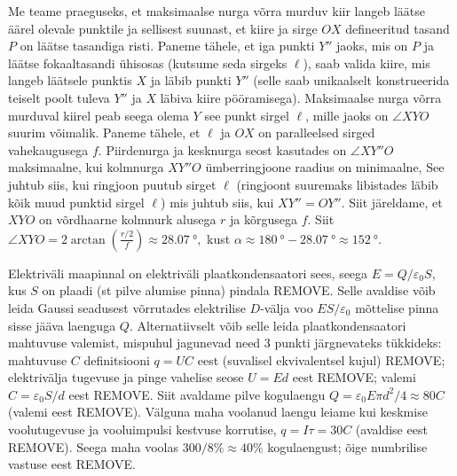 \documentclass[10pt]{article}
\newcommand{\p}[1]{REMOVE}
\begin{document}
Me teame praeguseks, et maksimaalse nurga võrra murduv kiir langeb läätse äärel olevale punktile ja sellisest suunast, et kiire ja sirge $OX$ defineeritud tasand $P$ on läätse tasandiga risti. Paneme tähele, et iga punkti $Y''$ jaoks, mis on $P$ ja läätse fokaaltasandi ühisosas (kutsume seda sirgeks $\ell$), saab valida kiire, mis langeb läätsele punktis $X$ ja läbib punkti $Y''$ (selle saab unikaalselt konstrueerida teiselt poolt tuleva $Y''$ ja $X$ läbiva kiire pööramisega). Maksimaalse nurga võrra murduval kiirel peab seega olema $Y$ see punkt sirgel $\ell$, mille jaoks on $\angle XYO$ suurim võimalik. Paneme tähele, et $\ell$ ja $OX$ on paralleelsed sirged vahekaugusega $f$. Piirdenurga ja kesknurga seost kasutades on $\angle XY''O$ maksimaalne, kui kolmnurga $XY''O$ ümberringjoone raadius on minimaalne, See juhtub siis, kui ringjoon puutub sirget $\ell$ (ringjoont suuremaks libistades läbib kõik muud punktid sirgel $\ell$) mis juhtub siis, kui $XY''=OY''$. Siit järeldame, et $XYO$ on võrdhaarne kolmnurk alusega $r$ ja kõrgusega $f$. Siit $\angle XYO=2\arctan\left(\frac{r/2}{f}\right)\approx \SI{28.07}{\degree},$ kust $\alpha\approx \SI{180}{\degree}-\SI{28.07}{\degree} \approx \SI{152}{\degree}$.
\probend
\bigskip


\solu
\osa Elektriväli maapinnal on elektriväli plaatkondensaatori sees, seega $E=Q/\varepsilon_0S$, kus $S$ on plaadi (st pilve alumise pinna) pindala \p3. Selle avaldise võib leida Gaussi seadusest võrrutades elektrilise $D$-välja voo $ES/\varepsilon_0$ mõttelise pinna sisse jääva laenguga $Q$. Alternatiivselt võib selle leida plaatkondensaatori mahtuvuse valemist, mispuhul jagunevad need 3 punkti järgnevateks tükkideks: mahtuvuse $C$ definitsiooni $q=UC$ eest (suvalisel ekvivalentsel kujul) \p1; elektrivälja tugevuse ja pinge vahelise seose $U=Ed$ eest \p1; valemi $C=\varepsilon_0S/d$ eest \p1. Siit avaldame pilve kogulaengu $Q=\varepsilon_0E\pi d^2/4\approx\SI{80}C$ (valemi eest \p1). Välguna maha voolanud laengu leiame kui keskmise voolutugevuse ja vooluimpulsi kestvuse korrutise, $q=I\tau=\SI{30}C$ (avaldise eest \p1). Seega maha voolas $300/8\%\approx 40\%$ kogulaengust; õige numbrilise vastuse eest \p1.
\end{document}
